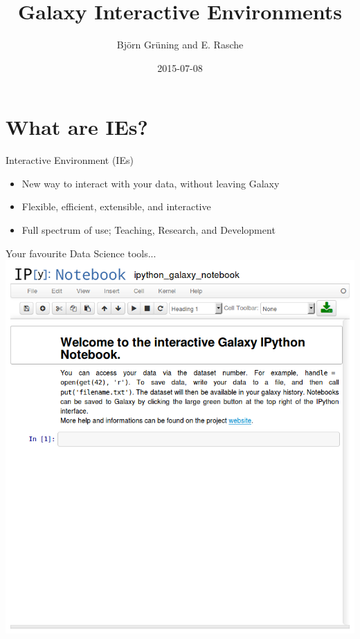 \documentclass[12pt]{beamer} %
\title[Interactive Environments]{Galaxy Interactive Environments}
\author[BG \& ER]{Bj\"orn Gr\"uning and E. Rasche}
\date{2015-07-08}
\begin{document}
\frame{\titlepage}

\section{What are IEs?}
\begin{frame}{Interactive Environment (IEs)}
	\begin{itemize}
    	\item New way to interact with your data, without leaving Galaxy
        \item Flexible, efficient, extensible, and interactive
        \item Full spectrum of use; Teaching, Research, and Development 
    \end{itemize}
\end{frame}

\begin{frame}{Your favourite Data Science tools...}
    \includegraphics[width=\textwidth]{./ipy-nogx.png}
\end{frame}
\end{document}
